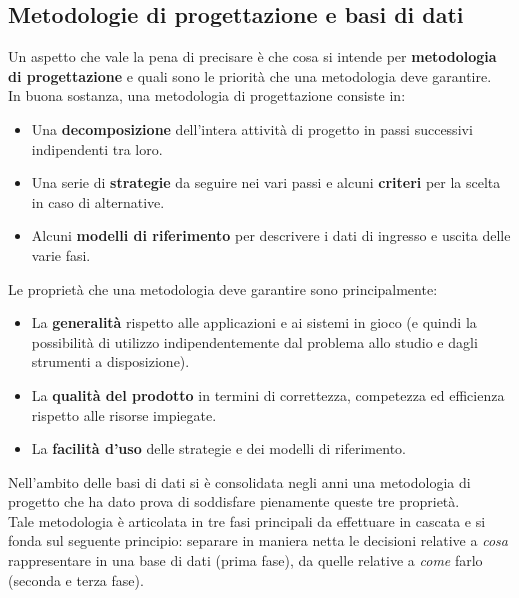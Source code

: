 \subsection{Metodologie di progettazione e basi di dati}
Un aspetto che vale la pena di precisare è che cosa si intende per \textbf{metodologia di progettazione} e quali sono le priorità che una metodologia deve garantire.\\
In buona sostanza, una metodologia di progettazione consiste in:
    \begin{itemize}
        \item{Una \textbf{decomposizione} dell'intera attività di progetto in passi successivi indipendenti tra loro.}
        \item{Una serie di \textbf{strategie} da seguire nei vari passi e alcuni \textbf{criteri} per la scelta in caso di alternative.}
        \item{Alcuni \textbf{modelli di riferimento} per descrivere i dati di ingresso e uscita delle varie fasi.}
    \end{itemize}
Le proprietà che una metodologia deve garantire sono principalmente:
    \begin{itemize}
        \item{La \textbf{generalità} rispetto alle applicazioni e ai sistemi in gioco (e quindi la possibilità di utilizzo indipendentemente dal problema allo studio e dagli strumenti a disposizione).}
        \item{La \textbf{qualità del prodotto} in termini di correttezza, competezza ed efficienza rispetto alle risorse impiegate.}
        \item{La \textbf{facilità d'uso} delle strategie e dei modelli di riferimento.}
    \end{itemize}
Nell'ambito delle basi di dati si è consolidata negli anni una metodologia di progetto che ha dato prova di soddisfare pienamente queste tre proprietà.\\
Tale metodologia è articolata in tre fasi principali da effettuare in cascata e si fonda sul seguente principio: separare in maniera netta le decisioni relative a \textit{cosa} rappresentare in una base di dati (prima fase), da quelle relative a \textit{come} farlo (seconda e terza fase).
